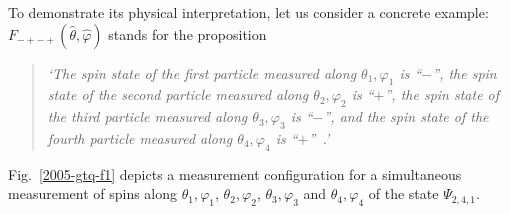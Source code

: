 \documentclass[fleqn,twoside]{article}      %
\begin{document}
To demonstrate its physical interpretation, let us consider a concrete example: $F_{- + - + } ({\hat \theta},{\hat \varphi} )$ stands for the proposition
\begin{quote}
{\em `The spin state of the first particle measured along $\theta_1,\varphi_1$ is ``$-$'',
      the spin state of the second particle measured along $\theta_2,\varphi_2$ is ``$+$'',
      the spin state of the third particle measured along $\theta_3,\varphi_3$ is ``$-$'',
      and the spin state of the fourth particle measured along $\theta_4,\varphi_4$ is ``$+$''~.'
}
\end{quote}
Fig.~\ref{2005-gtq-f1} depicts a measurement configuration
for a simultaneous measurement of spins along
$\theta_1,\varphi_1 $,
$\theta_2,\varphi_2 $,
$\theta_3,\varphi_3 $ and
$\theta_4,\varphi_4 $
of the state $\Psi_{2,4,1}$.
\begin{figure}[htbp]
\begin{center}


\end{center}
\end{figure}
\end{document}
